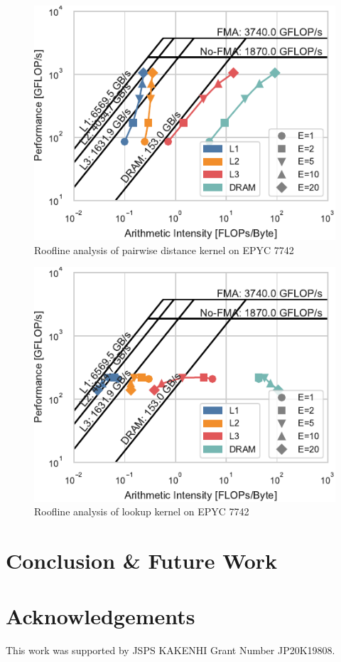 \documentclass[conference]{IEEEtran}
\begin{document}
\begin{figure}
    \centering
    \includegraphics{figs/roofline_distances_epyc}
    \caption{Roofline analysis of pairwise distance kernel on EPYC 7742}%
    \label{fig:architecture}
\end{figure}

\begin{figure}
    \centering
    \includegraphics{figs/roofline_lookup_epyc}
    \caption{Roofline analysis of lookup kernel on EPYC 7742}%
    \label{fig:architecture}
\end{figure}

\section{Conclusion \& Future Work}

\section*{Acknowledgements}
This work was supported by JSPS KAKENHI Grant Number JP20K19808.
\end{document}
